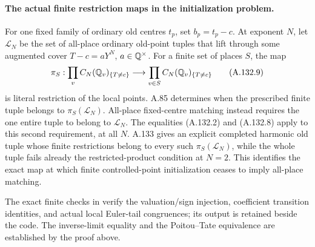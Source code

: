 \paragraph{The actual finite restriction maps in the initialization problem.}
For one fixed family of ordinary old centres \(t_p\),
set \(b_p=t_p-c\).
At exponent \(N\), let \(\mathcal L_N\) be the set of
all-place ordinary old-point tuples that lift through
some augmented cover \(T-c=aY^N\), \(a\in\mathbb Q^\times\).
For a finite set of places \(S\), the map
\[
  \pi_S:\prod_v C_N(\mathbb Q_v)_{\{T\ne c\}}
                  \longrightarrow\prod_{v\in S}C_N(\mathbb Q_v)_{\{T\ne c\}}
\tag{A.132.9}
\]
is literal restriction of the local points.
A.85 determines when the prescribed finite tuple
belongs to \(\pi_S(\mathcal L_N)\).
All-place fixed-centre matching instead requires the
one entire tuple to belong to \(\mathcal L_N\).
The equalities (A.132.2) and (A.132.8) apply to this
second requirement, at all \(N\).
A.133 gives an explicit completed harmonic old tuple
whose finite restrictions belong to every such
\(\pi_S(\mathcal L_N)\), while the whole tuple fails
already the restricted-product condition at \(N=2\).
This identifies the exact map at which finite
controlled-point initialization ceases to imply
all-place matching.

The exact finite checks in
verify the valuation/sign injection, coefficient
transition identities, and actual local Euler-tail
congruences; its output is retained beside the code.
The inverse-limit equality and the Poitou--Tate
equivalence are established by the proof above.


